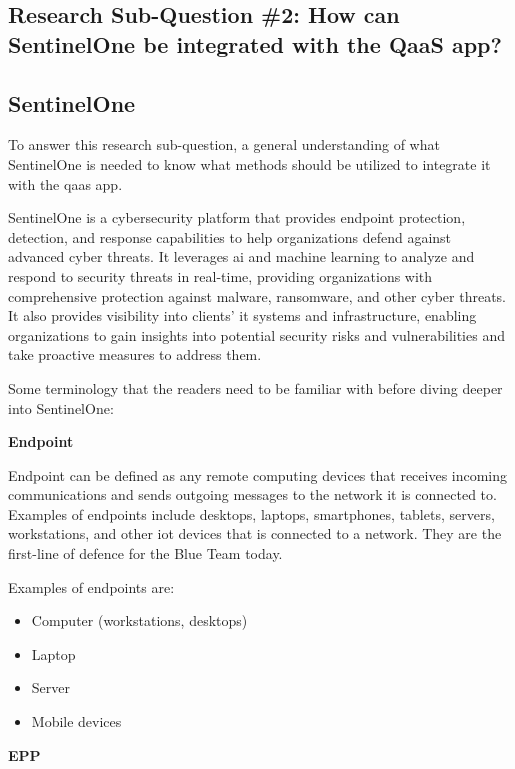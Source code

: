 \begin{multicols}{2}
      \section{Research Sub-Question \#2: How can SentinelOne be integrated with the QaaS app?}
      \subsection{SentinelOne} %
      To answer this research sub-question, a general understanding of what SentinelOne is needed to know what
      methods should be utilized to integrate it with the \acrshort{qaas} app.

      SentinelOne is a cybersecurity platform that provides endpoint protection, detection, and response capabilities to
      help organizations defend against advanced cyber threats. It leverages \acrlong{ai} and machine learning to analyze
      and respond to security threats in real-time, providing organizations with comprehensive protection against malware,
      ransomware, and other cyber threats. It also provides visibility into clients' \acrshort{it} systems and infrastructure,
      enabling organizations to gain insights into potential security risks and vulnerabilities and take proactive measures
      to address them.

      Some terminology that the readers need to be familiar with before diving deeper into SentinelOne:

      \textbf{Endpoint}

      Endpoint can be defined as any remote computing devices that receives incoming communications and sends outgoing messages
      to the network it is connected to. Examples of endpoints include desktops, laptops, smartphones, tablets, servers, workstations,
      and other \acrshort{iot} devices that is connected to a network. They are the first-line of defence for the Blue Team today.

      Examples of endpoints are:
      \begin{itemize}
            \item Computer (workstations, desktops)
            \item Laptop
            \item Server
            \item Mobile devices
      \end{itemize}

      \textbf{EPP}


\end{multicols}
